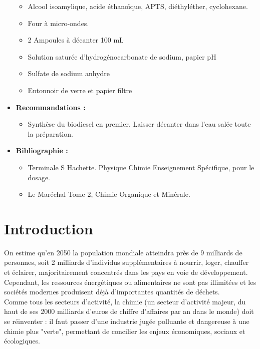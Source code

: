 \documentclass[11pt,a4paper]{report}
\begin{document}
\begin{itemize}
\begin{itemize}
		\item Alcool isoamylique, acide éthanoïque, APTS, diéthyléther, cyclohexane.
		\item Four à micro-ondes.
		\item 2 Ampoules à décanter 100 mL
		\item Solution saturée d'hydrogénocarbonate de sodium, papier pH
		\item Sulfate de sodium anhydre
		\item Entonnoir de verre et papier filtre
	\end{itemize}		
	
		
	\item \textbf{Recommandations :}
	\begin{itemize}
		\item Synthèse du biodiesel en premier. 
			Laisser décanter dans l'eau salée toute la préparation.\\
	\end{itemize}
	
	\item \textbf{Bibliographie :}
	\begin{itemize}
		\item Terminale S Hachette. Physique Chimie Enseignement Spécifique, pour le dosage.
		\item Le Maréchal Tome 2, Chimie Organique et Minérale.
	\end{itemize}
\end{itemize}

\newpage
\section*{Introduction}

On estime qu'en 2050 la population mondiale atteindra près de 9 milliards de personnes, soit 2 milliards d'individus supplémentaires à nourrir, loger, chauffer et éclairer, majoritairement concentrés dans les pays en voie de développement. Cependant, les ressources énergétiques ou alimentaires ne sont pas illimitées et les sociétés modernes produisent déjà d'importantes quantités de déchets.\\ 

Comme tous les secteurs d'activité, la chimie (un secteur d'activité majeur, du haut de ses 2000 milliards d'euros de chiffre d'affaires par an dans le monde) doit se réinventer : il faut passer d'une industrie jugée polluante et dangereuse à une chimie plus "verte", permettant de concilier les enjeux économiques, sociaux et écologiques.\\
\end{document}
